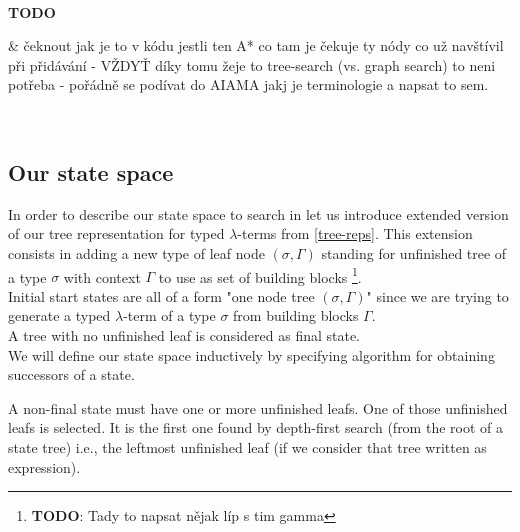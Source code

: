 \documentclass[12pt,a4paper]{report}
\newcommand{\lets}{let us\xspace}
\newcommand{\lterm}{$\lambda$-term\xspace}
\newcommand{\lterms}{$\lambda$-terms\xspace}
\newenvironment{todo}
{ ~\\[0.5em]
  \textbf{TODO}
  \begin{easylist}[itemize]}
{ \end{easylist}
  ~}
\begin{document}
\begin{todo}
& čeknout jak je to v kódu jestli ten A* co tam je čekuje ty
 nódy co už navštívil při přidávání - VŽDYŤ díky tomu žeje to tree-search 
 (vs. graph search) to neni potřeba - pořádně se podívat do AIAMA jakj
 je terminologie a napsat to sem.
\end{todo}



\subsection{Our state space}




In order to describe our state space to search in \lets introduce
extended version of our tree representation for typed \lterms from \ref{tree-reps}.
This extension consists in adding a new type of leaf node $(\sigma,\Gamma)$ 
standing for unfinished tree of a type $\sigma$ with context $\Gamma$ to use
as set of building blocks
\footnote{\textbf{TODO}: Tady to napsat nějak líp s tim gamma }.\\

Initial start states are all of a form "one node tree $(\sigma,\Gamma)$" since we
are trying to generate a typed \lterm of a type $\sigma$ from building blocks $\Gamma$.\\

A tree with no unfinished leaf is considered as final state.  \\

We will define our state space inductively by specifying algorithm for obtaining 
successors of a state.

A non-final state must have one or more unfinished leafs. 
One of those unfinished leafs is selected. 
It is the first one found by depth-first search (from the root of a state tree)
i.e., the leftmost unfinished leaf (if we consider that tree written as expression).
\end{document}
